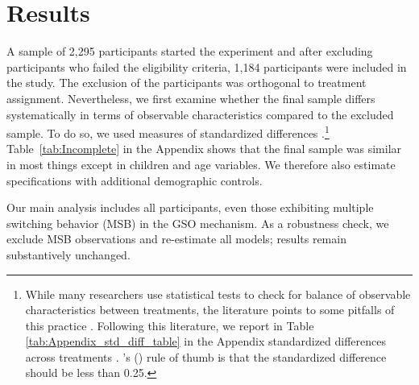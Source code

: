 \documentclass[12pt]{article}
\newcommand\citeapos[1]{\citeauthor{#1}'s (\citeyear{#1})} %
\begin{document}
\section{Results}
\label{Results}


A sample of 2,295 participants started the experiment and after excluding participants who failed the eligibility criteria, 1,184 participants were included in the study. The exclusion of the participants was orthogonal to treatment assignment. Nevertheless, we first examine whether the final sample differs systematically in terms of observable characteristics compared to the excluded sample. To do so, we used measures of standardized differences \citep{CochranRubin1973}.\footnote{While many researchers use statistical tests to check for balance of observable characteristics between treatments, the literature points to some pitfalls of this practice \citep[e.g.,][]{canavari2019run,DeatonCartwright2016,BrizEtAl2017,HoEtAl2007,MoherEtAl2010,MutzPemantle2015}. Following this literature, we report in Table \ref{tab:Appendix_std_diff_table} in the Appendix standardized differences across treatments \citep{ImbensRubin2016,ImbensWooldridge2009}. \citeapos{CochranRubin1973} rule of thumb is that the standardized difference should be less than 0.25.} Table~\ref{tab:Incomplete} in the Appendix shows that the final sample  was similar in most things except in children and age variables. We therefore also estimate specifications with additional demographic controls.

Our main analysis includes all participants, even those exhibiting multiple switching behavior (MSB) in the GSO mechanism. As a robustness check, we exclude MSB observations and re-estimate all models; results remain substantively unchanged.
\end{document}
